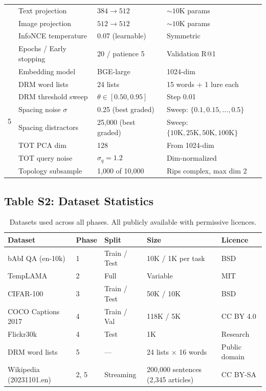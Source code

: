 \documentclass[11pt]{article}
\begin{document}
\begin{table}[!ht]
\begin{tabular}{@{}llll@{}}
 & Text projection & $384 \to 512$ & ${\sim}10$K params \\
 & Image projection & $512 \to 512$ & ${\sim}10$K params \\
 & InfoNCE temperature & 0.07 (learnable) & Symmetric \\
 & Epochs / Early stopping & 20 / patience 5 & Validation R@1 \\
\midrule
\multirow{8}{*}{5} & Embedding model & BGE-large & 1024-dim \\
 & DRM word lists & 24 lists & 15 words + 1 lure each \\
 & DRM threshold sweep & $\theta \in [0.50, 0.95]$ & Step 0.01 \\
 & Spacing noise $\sigma$ & 0.25 (best graded) & Sweep: $\{0.1, 0.15, \ldots, 0.5\}$ \\
 & Spacing distractors & 25{,}000 (best graded) & Sweep: $\{10\text{K}, 25\text{K}, 50\text{K}, 100\text{K}\}$ \\
 & TOT PCA dim & 128 & From 1024-dim \\
 & TOT query noise & $\sigma_q = 1.2$ & Dim-normalized \\
 & Topology subsample & 1{,}000 of 10{,}000 & Rips complex, max dim 2 \\
\bottomrule
\end{tabular}
\end{table}

\subsection*{Table S2: Dataset Statistics}

\begin{table}[!ht]
\centering
\caption{Datasets used across all phases. All publicly available with permissive licences.}
\label{tab:datasets}
\small
\begin{tabular}{@{}lllll@{}}
\toprule
\textbf{Dataset} & \textbf{Phase} & \textbf{Split} & \textbf{Size} & \textbf{Licence} \\
\midrule
bAbI QA (en-10k) & 1 & Train / Test & 10K / 1K per task & BSD \\
TempLAMA & 2 & Full & Variable & MIT \\
CIFAR-100 & 3 & Train / Test & 50K / 10K & BSD \\
COCO Captions 2017 & 4 & Train / Val & 118K / 5K & CC BY 4.0 \\
Flickr30k & 4 & Test & 1K & Research \\
DRM word lists & 5 & --- & 24 lists $\times$ 16 words & Public domain \\
Wikipedia (20231101.en) & 2, 5 & Streaming & 200{,}000 sentences (2{,}345 articles) & CC BY-SA \\
\bottomrule
\end{tabular}
\end{table}
\end{document}
